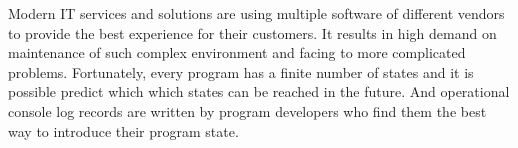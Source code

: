Modern IT services and solutions are using multiple software of different vendors to provide the best experience for their customers. It results in high demand on maintenance of such complex environment and facing to more complicated problems. Fortunately, every program has a finite number of states and it is possible predict which which states can be reached in the future. And operational console log records are written by program developers who find them the best way to introduce their program state.